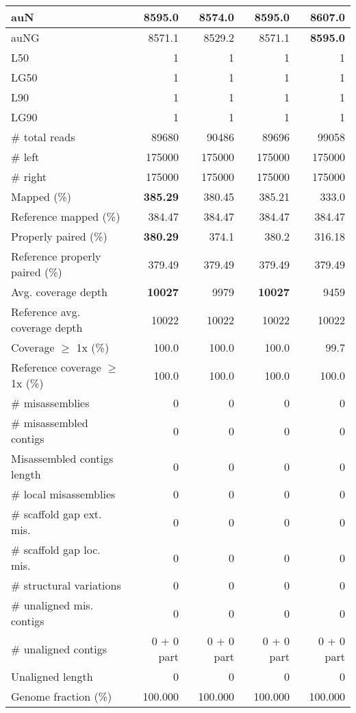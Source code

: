 \documentclass[12pt,a4paper]{article}
\begin{document}
\begin{table}[ht]
\begin{center}
\begin{tabular}{|l*{4}{|r}|}
auN & 8595.0 & 8574.0 & 8595.0 & {\bf 8607.0} \\ \hline
auNG & 8571.1 & 8529.2 & 8571.1 & {\bf 8595.0} \\ \hline
L50 & 1 & 1 & 1 & 1 \\ \hline
LG50 & 1 & 1 & 1 & 1 \\ \hline
L90 & 1 & 1 & 1 & 1 \\ \hline
LG90 & 1 & 1 & 1 & 1 \\ \hline
\# total reads & 89680 & 90486 & 89696 & 99058 \\ \hline
\# left & 175000 & 175000 & 175000 & 175000 \\ \hline
\# right & 175000 & 175000 & 175000 & 175000 \\ \hline
Mapped (\%) & {\bf 385.29} & 380.45 & 385.21 & 333.0 \\ \hline
Reference mapped (\%) & 384.47 & 384.47 & 384.47 & 384.47 \\ \hline
Properly paired (\%) & {\bf 380.29} & 374.1 & 380.2 & 316.18 \\ \hline
Reference properly paired (\%) & 379.49 & 379.49 & 379.49 & 379.49 \\ \hline
Avg. coverage depth & {\bf 10027} & 9979 & {\bf 10027} & 9459 \\ \hline
Reference avg. coverage depth & 10022 & 10022 & 10022 & 10022 \\ \hline
Coverage $\geq$ 1x (\%) & 100.0 & 100.0 & 100.0 & 99.7 \\ \hline
Reference coverage $\geq$ 1x (\%) & 100.0 & 100.0 & 100.0 & 100.0 \\ \hline
\# misassemblies & 0 & 0 & 0 & 0 \\ \hline
\# misassembled contigs & 0 & 0 & 0 & 0 \\ \hline
Misassembled contigs length & 0 & 0 & 0 & 0 \\ \hline
\# local misassemblies & 0 & 0 & 0 & 0 \\ \hline
\# scaffold gap ext. mis. & 0 & 0 & 0 & 0 \\ \hline
\# scaffold gap loc. mis. & 0 & 0 & 0 & 0 \\ \hline
\# structural variations & 0 & 0 & 0 & 0 \\ \hline
\# unaligned mis. contigs & 0 & 0 & 0 & 0 \\ \hline
\# unaligned contigs & 0 + 0 part & 0 + 0 part & 0 + 0 part & 0 + 0 part \\ \hline
Unaligned length & 0 & 0 & 0 & 0 \\ \hline
Genome fraction (\%) & 100.000 & 100.000 & 100.000 & 100.000 \\ \hline

\end{tabular}
\end{center}
\end{table}
\end{document}
